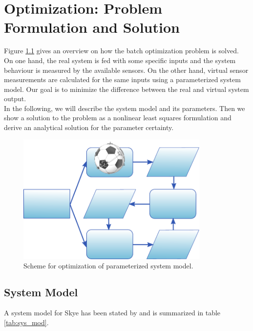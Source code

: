 \chapter{Optimization: Problem Formulation and Solution}
\label{chap:batch}

Figure \ref{fig:batch_opti} gives an overview on how the batch optimization problem is solved.
On one hand, the real system is fed with some specific inputs and the system behaviour is measured by the available sensors.
On the other hand, virtual sensor measurements are calculated for the same inputs using a parameterized system model.
Our goal is to minimize the difference between the real and virtual system output.
\\


In the following, we will describe the system model and its parameters.
Then we show a solution to the problem as a nonlinear least squares formulation and derive an analytical solution for the parameter certainty.

\begin{figure}[btp]
\label{fig:batch_opti}
\centering
\includegraphics[width=0.85\textwidth]{images/problem_formulation.pdf}
\caption{Scheme for optimization of parameterized system model.}
\end{figure}

\section{System Model}
\label{sec:system_model}
A system model for Skye has been stated by \citet{Weichart2012} and is summarized in table \ref{tab:sys_mod}.

